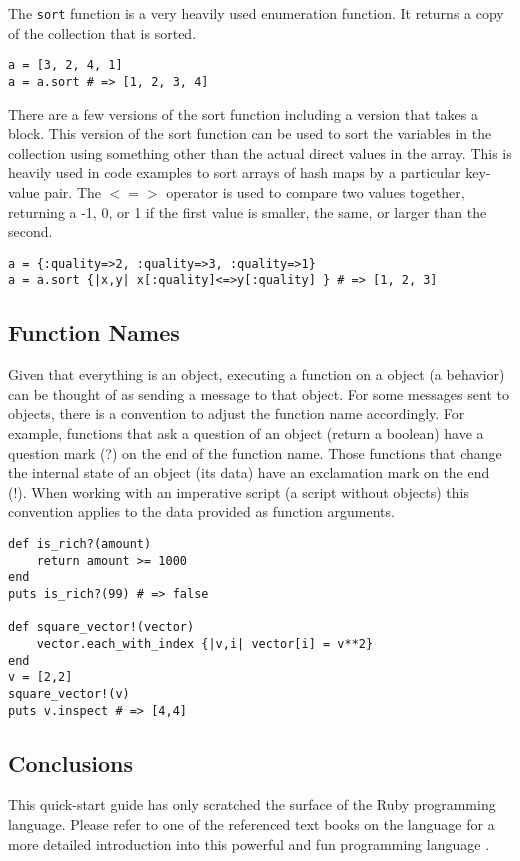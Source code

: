 \begin{bibunit}
The \texttt{sort} function is a very heavily used enumeration function. It returns a copy of the collection that is sorted. 

\begin{lstlisting}
a = [3, 2, 4, 1]
a = a.sort # => [1, 2, 3, 4]
\end{lstlisting}

There are a few versions of the sort function including a version that takes a block. This version of the sort function can be used to sort the variables in the collection using something other than the actual direct values in the array. This is heavily used in code examples to sort arrays of hash maps by a particular key-value pair. The \texttt{$<=>$} operator is used to compare two values together, returning a -1, 0, or 1 if the first value is smaller, the same, or larger than the second. 

\begin{lstlisting}
a = {:quality=>2, :quality=>3, :quality=>1}
a = a.sort {|x,y| x[:quality]<=>y[:quality] } # => [1, 2, 3]
\end{lstlisting}

\subsection{Function Names}
Given that everything is an object, executing a function on a object (a behavior) can be thought of as sending a message to that object. For some messages sent to objects, there is a convention to adjust the function name accordingly. For example, functions that ask a question of an object (return a boolean) have a question mark (?) on the end of the function name. Those functions that change the internal state of an object (its data) have an exclamation mark on the end (!). When working with an imperative script (a script without objects) this convention applies to the data provided as function arguments.

\begin{lstlisting}
def is_rich?(amount)
	return amount >= 1000
end
puts is_rich?(99) # => false

def square_vector!(vector)
	vector.each_with_index {|v,i| vector[i] = v**2}
end
v = [2,2]
square_vector!(v) 
puts v.inspect # => [4,4]
\end{lstlisting}

\subsection{Conclusions}
This quick-start guide has only scratched the surface of the Ruby programming language. Please refer to one of the referenced text books on the language for a more detailed introduction into this powerful and fun programming language \cite{Thomas2004, Flanagan2008}.

\renewcommand{\bibsection}{\section{\bibname}}
\putbib
\end{bibunit}